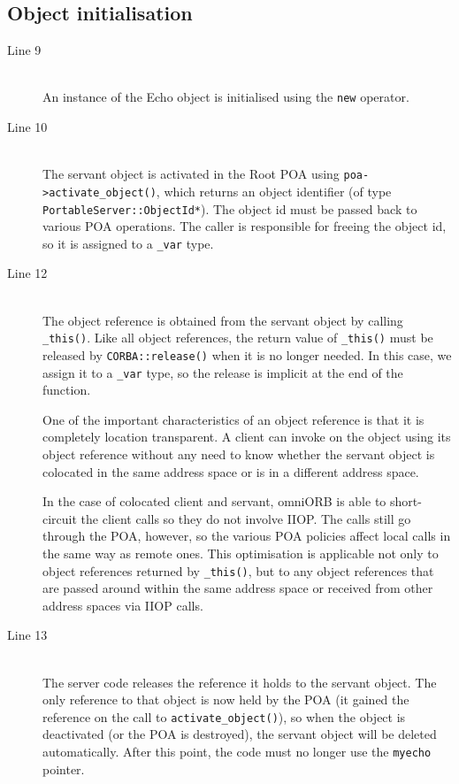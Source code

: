\documentclass[11pt,twoside,a4paper]{book}
\newcommand{\type}[1]{\texttt{#1}}
\newcommand{\code}[1]{\texttt{#1}}
\newcommand{\op}[1]{\texttt{#1()}}
\newcommand{\dsc}{\discretionary{}{}{}}
\begin{document}
\subsection{Object initialisation}

\begin{description}

\item[Line 9]\mbox{}\\
%
An instance of the Echo object is initialised using the \code{new}
operator.

\item[Line 10]\mbox{}\\
%
The servant object is activated in the Root POA using
\op{poa->activate\_\dsc{}object}, which returns an object identifier
(of type \type{PortableServer::\dsc{}ObjectId*}). The object id must
be passed back to various POA operations. The caller is responsible
for freeing the object id, so it is assigned to a \type{\_var} type.

\item[Line 12]\mbox{}\\
%
The object reference is obtained from the servant object by calling
\op{\_this}. Like all object references, the return value of
\op{\_this} must be released by \op{CORBA::release} when it is no
longer needed. In this case, we assign it to a \type{\_var} type, so
the release is implicit at the end of the function.

One of the important characteristics of an object reference is that it
is completely location transparent. A client can invoke on the object
using its object reference without any need to know whether the
servant object is colocated in the same address space or is in a
different address space.

In the case of colocated client and servant, omniORB is able to
short-circuit the client calls so they do not involve IIOP. The calls
still go through the POA, however, so the various POA policies affect
local calls in the same way as remote ones. This optimisation is
applicable not only to object references returned by \op{\_this}, but
to any object references that are passed around within the same
address space or received from other address spaces via IIOP calls.

\item[Line 13]\mbox{}\\
%
The server code releases the reference it holds to the servant
object. The only reference to that object is now held by the POA (it
gained the reference on the call to \op{activate\_object}), so when
the object is deactivated (or the POA is destroyed), the servant
object will be deleted automatically. After this point, the code must
no longer use the \code{myecho} pointer.

\end{description}
\end{document}
